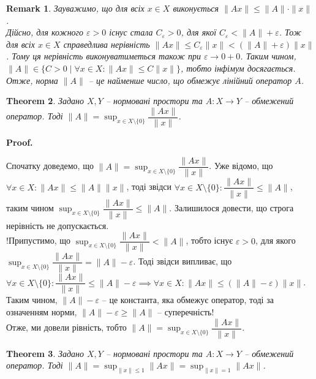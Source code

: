 \documentclass[a4paper, 10pt]{article}
\makeatletter
\theoremstyle{theoremdd}
\newtheorem{theorem}{Theorem}[subsection]
\theoremstyle{theoremdd}
\theoremstyle{theoremdd}
\theoremstyle{theoremdd}
\theoremstyle{theoremdd}
\theoremstyle{theoremdd}
\newtheorem{remark}[theorem]{Remark}
\theoremstyle{theoremdd}
\theoremstyle{theoremdd}
\renewenvironment{proof}[1][Proof.\\]{\par
\pushQED{\hfill \qed}%
\normalfont \topsep6\p@\@plus6\p@\relax
\trivlist
\item\relax
{\bfseries
#1\@addpunct{.}}\hspace\labelsep\ignorespaces
}{%
\popQED\endtrivlist\@endpefalse
}
\makeatother
\begin{document}
\begin{remark}
Зауважимо, що для всіх $x \in X$ виконується $\|Ax\| \leq \|A\| \cdot \|x\|$.\\
Дійсно, для кожного $\varepsilon > 0$ існус стала $C_\varepsilon > 0$, для якої $C_\varepsilon < \|A\| + \varepsilon$. Тож для всіх $x \in X$ справедлива нерівність $\|A x\| \leq C_\varepsilon \|x\| < (\| A \| + \varepsilon) \|x\|$. Тому ця нерівність виконуватиметься також при $\varepsilon \to 0+0$. Таким чином, $\|A\| \in \{C > 0 \mid \forall x \in X: \|Ax\| \leq C \|x\|\}$, тобто інфімум досягається. \\
Отже, норма $\|A\|$ -- це найменше число, що обмежує лінійний оператор $A$.
\end{remark}

\begin{theorem}
Задано $X,Y$ -- нормовані простори та $A \colon X \to Y$ -- обмежений оператор. Тоді $\displaystyle\|A\| = \sup_{x \in X \setminus \{0\}} \dfrac{\| Ax\|}{\|x\|}$.
\end{theorem}

\begin{proof}
Спочатку доведемо, що $\|A\| = \displaystyle\sup_{x \in X \setminus \{0\}} \dfrac{\| Ax\|}{\|x\|}$. Уже відомо, що $\forall x \in X: \|Ax \| \leq \|A \| \|x\|$, тоді звідси $\forall x \in X \setminus \{0\}: \dfrac{\|Ax\|}{\|x\|} \leq \|A\|$, таким чином $\displaystyle\sup_{x \in X \setminus \{0\}} \dfrac{\|Ax\|}{\|x\|} \leq \|A\|$. Залишилося довести, що строга нерівність не допускається.\\
!Припустимо, що $\displaystyle\sup_{x \in X \setminus \{0\}} \dfrac{\|Ax\|}{\|x\|} < \|A\|$, тобто існує $\varepsilon > 0$, для якого $\displaystyle\sup_{x \in X \setminus \{0\}} \dfrac{\|Ax\|}{\|x\|} = \|A\|- \varepsilon$. Тоді звідси випливає, що $\forall x \in X \setminus \{0\}: \dfrac{\|Ax\| }{\|x\|} \leq \|A\| - \varepsilon \implies \forall x \in X: \|Ax\| \leq (\|A\|-\varepsilon) \|x\|$. Таким чином, $\|A\|-\varepsilon$ -- це константа, яка обмежує оператор, тоді за означенням норми, $\|A\| - \varepsilon \geq \|A\|$ -- суперечність!\\
Отже, ми довели рівність, тобто $\|A\| = \displaystyle\sup_{x \in X \setminus \{0\}} \dfrac{\| Ax\|}{\|x\|}$.
\end{proof}

\begin{theorem}
Задано $X,Y$ -- нормовані простори та $A \colon X \to Y$ -- обмежений оператор. Тоді $\displaystyle\|A\| = \sup_{\|x\| \leq 1} \|Ax\| = \sup_{\|x\| = 1} \|Ax\|$.
\end{theorem}
\end{document}
